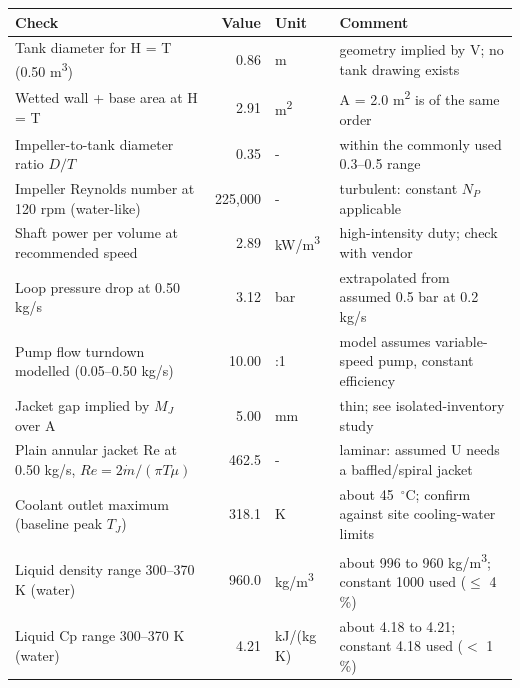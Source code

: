 \begin{tabular}{p{6.2cm}rlp{5.0cm}}
\toprule
Check & Value & Unit & Comment \\
\midrule
Tank diameter for H = T (0.50 m\textsuperscript{3}) & 0.86 & m & geometry implied by V; no tank drawing exists \\
Wetted wall + base area at H = T & 2.91 & m\textsuperscript{2} & A = 2.0 m\textsuperscript{2} is of the same order \\
Impeller-to-tank diameter ratio $D/T$ & 0.35 & - & within the commonly used 0.3--0.5 range \\
Impeller Reynolds number at 120 rpm (water-like) & 225,000 & - & turbulent: constant $N_P$ applicable \\
Shaft power per volume at recommended speed & 2.89 & kW/m\textsuperscript{3} & high-intensity duty; check with vendor \\
Loop pressure drop at 0.50 kg/s & 3.12 & bar & extrapolated from assumed 0.5 bar at 0.2 kg/s \\
Pump flow turndown modelled (0.05--0.50 kg/s) & 10.00 & :1 & model assumes variable-speed pump, constant efficiency \\
Jacket gap implied by $M_J$ over A & 5.00 & mm & thin; see isolated-inventory study \\
Plain annular jacket Re at 0.50 kg/s, $Re = 2\dot m/(\pi T\mu)$ & 462.5 & - & laminar: assumed U needs a baffled/spiral jacket \\
Coolant outlet maximum (baseline peak $T_J$) & 318.1 & K & about 45~$^{\circ}$C; confirm against site cooling-water limits \\
Liquid density range 300--370 K (water) & 960.0 & kg/m\textsuperscript{3} & about 996 to 960 kg/m\textsuperscript{3}; constant 1000 used ($\leq$ 4 \%) \\
Liquid Cp range 300--370 K (water) & 4.21 & kJ/(kg K) & about 4.18 to 4.21; constant 4.18 used ($<$ 1 \%) \\
\bottomrule
\end{tabular}
